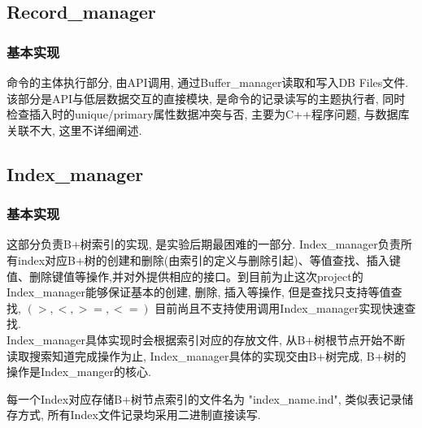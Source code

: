 \documentclass[10pt]{article}
\begin{document}
\begin{CJK}{UTF8}{gkai}
	\subsection{Record\_manager}
	\subsubsection{基本实现}
	命令的主体执行部分, 由API调用, 通过Buffer\_manager读取和写入DB Files文件.该部分是API与低层数据交互的直接模块, 是命令的记录读写的主题执行者, 同时检查插入时的unique/primary属性数据冲突与否, 主要为C++程序问题, 与数据库关联不大, 这里不详细阐述.
	\subsection{Index\_manager}
		\subsubsection{基本实现}
这部分负责B+树索引的实现, 是实验后期最困难的一部分. Index\_manager负责所有index对应B+树的创建和删除(由索引的定义与删除引起)、等值查找、插入键值、删除键值等操作,并对外提供相应的接口。到目前为止这次project的Index\_manager能够保证基本的创建, 删除, 插入等操作, 但是查找只支持等值查找, $(>, <, >=, <=)$ 目前尚且不支持使用调用Index\_manager实现快速查找. 
\\
 Index\_manager具体实现时会根据索引对应的存放文件, 从B+树根节点开始不断读取搜索知道完成操作为止, Index\_manager具体的实现交由B+树完成, B+树的操作是Index\_manger的核心. 

每一个Index对应存储B+树节点索引的文件名为 "index\_name.ind", 类似表记录储存方式, 所有Index文件记录均采用二进制直接读写.

\end{CJK}
\end{document}
